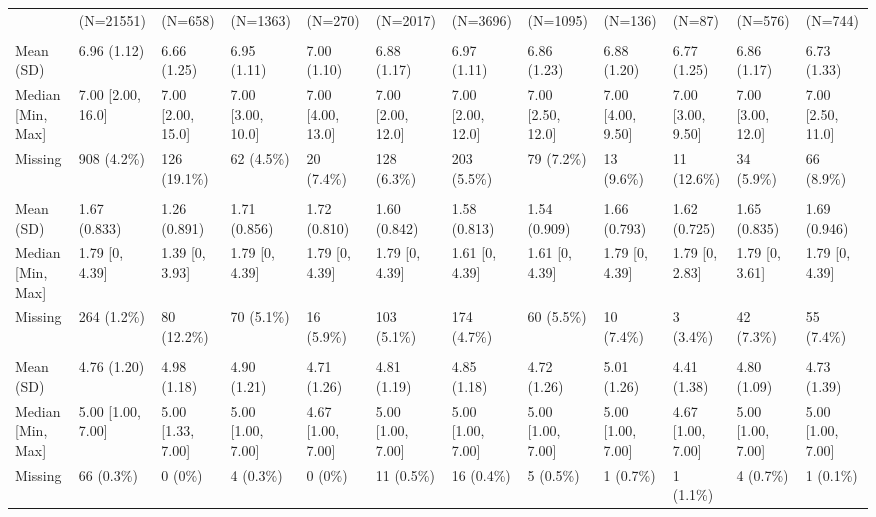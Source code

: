 \documentclass[
  single column]{article}
\begin{document}
\begin{landscape}
\begin{longtable}[t]{llllllllllll}
\endfoot
\bottomrule
\endlastfoot
 & (N=21551) & (N=658) & (N=1363) & (N=270) & (N=2017) & (N=3696) & (N=1095) & (N=136) & (N=87) & (N=576) & (N=744)\\
\addlinespace[0.3em]
\multicolumn{12}{l}{\textbf{Sleep}}\\
\hspace{1em}Mean (SD) & 6.96 (1.12) & 6.66 (1.25) & 6.95 (1.11) & 7.00 (1.10) & 6.88 (1.17) & 6.97 (1.11) & 6.86 (1.23) & 6.88 (1.20) & 6.77 (1.25) & 6.86 (1.17) & 6.73 (1.33)\\
\hspace{1em}Median [Min, Max] & 7.00 [2.00, 16.0] & 7.00 [2.00, 15.0] & 7.00 [3.00, 10.0] & 7.00 [4.00, 13.0] & 7.00 [2.00, 12.0] & 7.00 [2.00, 12.0] & 7.00 [2.50, 12.0] & 7.00 [4.00, 9.50] & 7.00 [3.00, 9.50] & 7.00 [3.00, 12.0] & 7.00 [2.50, 11.0]\\
\hspace{1em}Missing & 908 (4.2\%) & 126 (19.1\%) & 62 (4.5\%) & 20 (7.4\%) & 128 (6.3\%) & 203 (5.5\%) & 79 (7.2\%) & 13 (9.6\%) & 11 (12.6\%) & 34 (5.9\%) & 66 (8.9\%)\\
\addlinespace[0.3em]
\multicolumn{12}{l}{\textbf{Hours of Exercise (log)}}\\
\hspace{1em}Mean (SD) & 1.67 (0.833) & 1.26 (0.891) & 1.71 (0.856) & 1.72 (0.810) & 1.60 (0.842) & 1.58 (0.813) & 1.54 (0.909) & 1.66 (0.793) & 1.62 (0.725) & 1.65 (0.835) & 1.69 (0.946)\\
\hspace{1em}Median [Min, Max] & 1.79 [0, 4.39] & 1.39 [0, 3.93] & 1.79 [0, 4.39] & 1.79 [0, 4.39] & 1.79 [0, 4.39] & 1.61 [0, 4.39] & 1.61 [0, 4.39] & 1.79 [0, 4.39] & 1.79 [0, 2.83] & 1.79 [0, 3.61] & 1.79 [0, 4.39]\\
\hspace{1em}Missing & 264 (1.2\%) & 80 (12.2\%) & 70 (5.1\%) & 16 (5.9\%) & 103 (5.1\%) & 174 (4.7\%) & 60 (5.5\%) & 10 (7.4\%) & 3 (3.4\%) & 42 (7.3\%) & 55 (7.4\%)\\
\addlinespace[0.3em]
\multicolumn{12}{l}{\textbf{Short Form Health}}\\
\hspace{1em}Mean (SD) & 4.76 (1.20) & 4.98 (1.18) & 4.90 (1.21) & 4.71 (1.26) & 4.81 (1.19) & 4.85 (1.18) & 4.72 (1.26) & 5.01 (1.26) & 4.41 (1.38) & 4.80 (1.09) & 4.73 (1.39)\\
\hspace{1em}Median [Min, Max] & 5.00 [1.00, 7.00] & 5.00 [1.33, 7.00] & 5.00 [1.00, 7.00] & 4.67 [1.00, 7.00] & 5.00 [1.00, 7.00] & 5.00 [1.00, 7.00] & 5.00 [1.00, 7.00] & 5.00 [1.00, 7.00] & 4.67 [1.00, 7.00] & 5.00 [1.00, 7.00] & 5.00 [1.00, 7.00]\\
\hspace{1em}Missing & 66 (0.3\%) & 0 (0\%) & 4 (0.3\%) & 0 (0\%) & 11 (0.5\%) & 16 (0.4\%) & 5 (0.5\%) & 1 (0.7\%) & 1 (1.1\%) & 4 (0.7\%) & 1 (0.1\%)\\*

\end{longtable}

\endgroup{}


\end{landscape}
\end{document}

